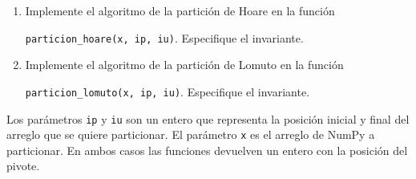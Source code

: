 \documentclass[dcc, sol]{fcfmcourse}
\begin{document}
\begin{problems}
\begin{enumerate}
    \item Implemente el algoritmo de la partición de Hoare en la función
    
    \texttt{particion\_hoare(x, ip, iu)}. Especifique el invariante.
    \item Implemente el algoritmo de la partición de Lomuto en la función
    
    \texttt{particion\_lomuto(x, ip, iu)}. Especifique el invariante.
\end{enumerate}

Los parámetros \texttt{ip} y \texttt{iu} son un entero que representa la posición inicial y final del arreglo que se quiere particionar. El parámetro \texttt{x} es el arreglo de NumPy a particionar. En ambos casos las funciones devuelven un entero con la posición del pivote.

\end{problems}
\end{document}
